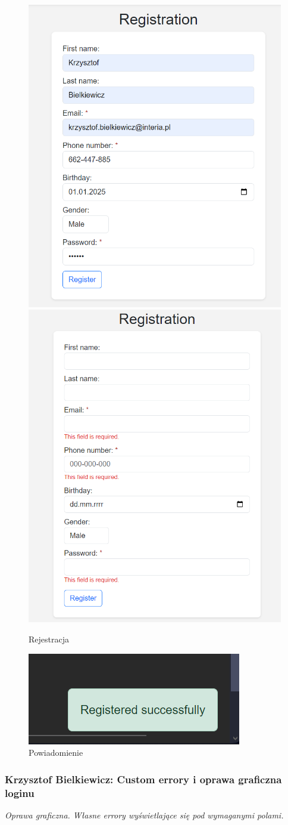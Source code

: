 \documentclass[12pt,a4paper,oneside]{article}
\theoremstyle{definition}
\numberwithin{equation}{section}
\begin{document}
\begin{figure}[H]
    \centering
    \includegraphics[width=0.5\columnwidth]{images/krzysztofBImages/register-login/registration.png}
    \includegraphics[width=0.48\columnwidth]{images/krzysztofBImages/register-login/register-errors.png}
    \caption{Rejestracja}
    \label{register}
\end{figure}
\begin{figure}[H]
    \centering
    \includegraphics[width=0.6\columnwidth]{images/krzysztofBImages/register-login/message.png}
    \caption{Powiadomienie}
    \label{message}
\end{figure}


\subsubsection{Krzysztof Bielkiewicz: Custom errory i oprawa graficzna loginu}
\label{1.3.18}
\textit{Oprawa graficzna. Własne errory wyświetlające się pod wymaganymi polami.}
\end{document}
